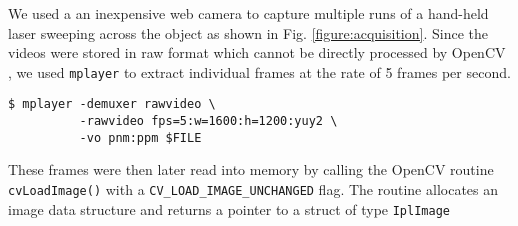 We used a an inexpensive web camera to capture multiple runs of a hand-held
laser sweeping across the object as shown in Fig. \ref{figure:acquisition}.
Since the videos were stored in raw format which cannot be directly processed
by OpenCV \cite{bradski:2008}, we used \texttt{mplayer} to extract individual
frames at the rate of 5 frames per second.

\begin{verbatim}
$ mplayer -demuxer rawvideo \
          -rawvideo fps=5:w=1600:h=1200:yuy2 \
          -vo pnm:ppm $FILE
\end{verbatim}

These frames were then later read into memory by calling the OpenCV routine
\texttt{cvLoadImage()} with a \texttt{CV\_LOAD\_IMAGE\_UNCHANGED} flag. The
routine allocates an image data structure and returns a pointer to a struct of
type \texttt{IplImage}
